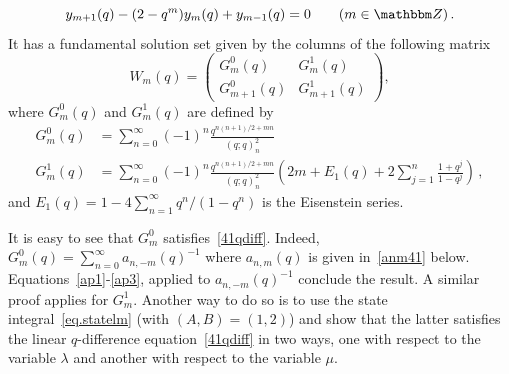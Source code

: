 \documentclass[12pt,reqno]{amsart}
\theoremstyle{definition}
\def\BZ{\mathbbm Z}
\begin{document}
\begin{equation}
  \label{41qdiff}
  y_{m+1}(q) -(2-q^m) y_m(q) + y_{m-1}(q)=0 \qquad (m \in \BZ) \,.
\end{equation}
It has a fundamental solution set given by the columns of the
following matrix
\begin{equation}
  \label{Gfund}
  W_m(q) =
  \begin{pmatrix} G^0_m(q) & G^1_m(q) \\ G^0_{m+1}(q) & G^1_{m+1}(q)
  \end{pmatrix},
\end{equation}  
where $G^0_m(q)$ and $G^1_m(q)$ are defined by
\begin{subequations}
  \begin{align}
\label{gm}
    G^0_m(q)
    &=\sum_{n=0}^\infty (-1)^n \frac{q^{n(n+1)/2+m n}}{(q;q)_n^2}
    \\
\label{Gm}
    G^1_m(q)
    &=\sum_{n=0}^\infty (-1)^n \frac{q^{n(n+1)/2+m n}}{(q;q)_n^2}
      \left(2m+ E_1(q) + 2 \sum_{j=1}^n \frac{1+q^j}{1-q^j} \right) \,,
\end{align}
\end{subequations}
%
and $E_1(q)=1-4\sum_{n=1}^\infty q^n/(1-q^n)$ is the Eisenstein series. 

It is easy to see that $G^0_m$ satisfies~\eqref{41qdiff}. Indeed,
$G^0_m(q)=\sum_{n=0}^\infty a_{n,-m}(q)^{-1}$ where $a_{n,m}(q)$ is
given in~\eqref{anm41} below. Equations~\eqref{ap1}-\eqref{ap3},
applied to $a_{n,-m}(q)^{-1}$ conclude the result. A similar proof
applies for $G^1_m$. Another way to do so is to use the state
integral~\eqref{eq.statelm} (with $(A,B)=(1,2)$) and show that the
latter satisfies the linear $q$-difference equation~\eqref{41qdiff} in
two ways, one with respect to the variable $\lambda$ and another with
respect to the variable $\mu$.
\end{document}
